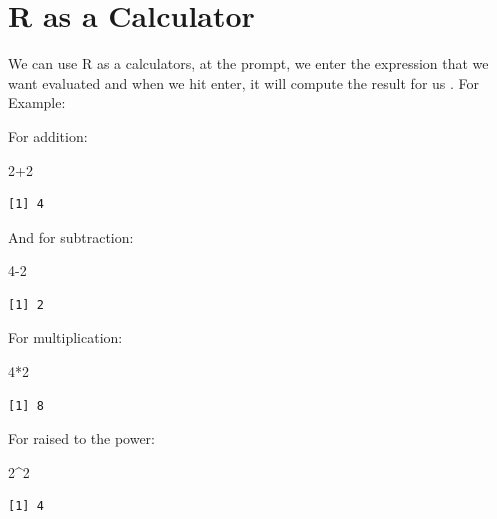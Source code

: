 \documentclass[
  letterpaper,
  DIV=11,
  numbers=noendperiod]{scrreprt}
\newenvironment{Shaded}{\begin{snugshade}}{\end{snugshade}}
\newcommand{\DecValTok}[1]{\textcolor[rgb]{0.68,0.00,0.00}{#1}}
\newcommand{\SpecialCharTok}[1]{\textcolor[rgb]{0.37,0.37,0.37}{#1}}
\begin{document}
\hypertarget{r-as-a-calculator}{%
\section{R as a Calculator}\label{r-as-a-calculator}}

We can use R as a calculators, at the prompt, we enter the expression
that we want evaluated and when we hit enter, it will compute the result
for us . For Example:

For addition:

\begin{Shaded}
\begin{Highlighting}[]
\DecValTok{2}\SpecialCharTok{+}\DecValTok{2}
\end{Highlighting}
\end{Shaded}

\begin{verbatim}
[1] 4
\end{verbatim}

And for subtraction:

\begin{Shaded}
\begin{Highlighting}[]
\DecValTok{4{-}2}
\end{Highlighting}
\end{Shaded}

\begin{verbatim}
[1] 2
\end{verbatim}

For multiplication:

\begin{Shaded}
\begin{Highlighting}[]
\DecValTok{4}\SpecialCharTok{*}\DecValTok{2}
\end{Highlighting}
\end{Shaded}

\begin{verbatim}
[1] 8
\end{verbatim}

For raised to the power:

\begin{Shaded}
\begin{Highlighting}[]
\DecValTok{2}\SpecialCharTok{\^{}}\DecValTok{2}
\end{Highlighting}
\end{Shaded}

\begin{verbatim}
[1] 4
\end{verbatim}
\end{document}
